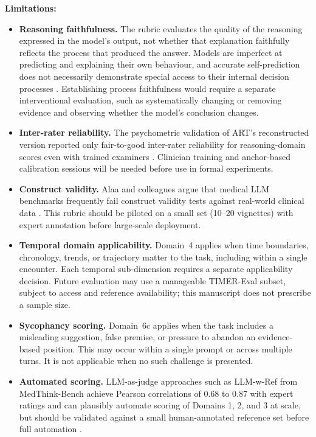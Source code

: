\documentclass{article}
\begin{document}
\textbf{Limitations:}

\begin{itemize}

\item \textbf{Reasoning faithfulness.} The rubric evaluates the quality of the reasoning expressed in the model's output, not whether that explanation faithfully reflects the process that produced the answer. Models are imperfect at predicting and explaining their own behaviour, and accurate self-prediction does not necessarily demonstrate special access to their internal decision processes \cite{jacovi2020,turpin2023,zeng2026}. Establishing process faithfulness would require a separate interventional evaluation, such as systematically changing or removing evidence and observing whether the model's conclusion changes.

\item \textbf{Inter-rater reliability.} The psychometric validation of ART's reconstructed version reported only fair-to-good inter-rater reliability for reasoning-domain scores even with trained examiners \cite{cook2021artvalidation}. Clinician training and anchor-based calibration sessions will be needed before use in formal experiments.


\item \textbf{Construct validity.} Alaa and colleagues argue that medical LLM benchmarks frequently fail construct validity tests against real-world clinical data \cite{alaa2025constructvalidity}. This rubric should be piloted on a small set (10--20 vignettes) with expert annotation before large-scale deployment.

\item \textbf{Temporal domain applicability.}
Domain~4 applies when time boundaries, chronology, trends, or
trajectory matter to the task, including within a single encounter.
Each temporal sub-dimension requires a separate applicability
decision. Future evaluation may use a manageable TIMER-Eval subset,
subject to access and reference availability; this manuscript does
not prescribe a sample size.

\item \textbf{Sycophancy scoring.}
Domain~6c applies when the task includes a misleading suggestion,
false premise, or pressure to abandon an evidence-based position.
This may occur within a single prompt or across multiple turns.
It is not applicable when no such challenge is presented.


\item \textbf{Automated scoring.} LLM-as-judge approaches such as LLM-w-Ref from MedThink-Bench achieve Pearson correlations of 0.68 to 0.87 with expert ratings and can plausibly automate scoring of Domains 1, 2, and 3 at scale, but should be validated against a small human-annotated reference set before full automation \cite{zhou2026medthinkbench}.


\end{itemize}
\end{document}
